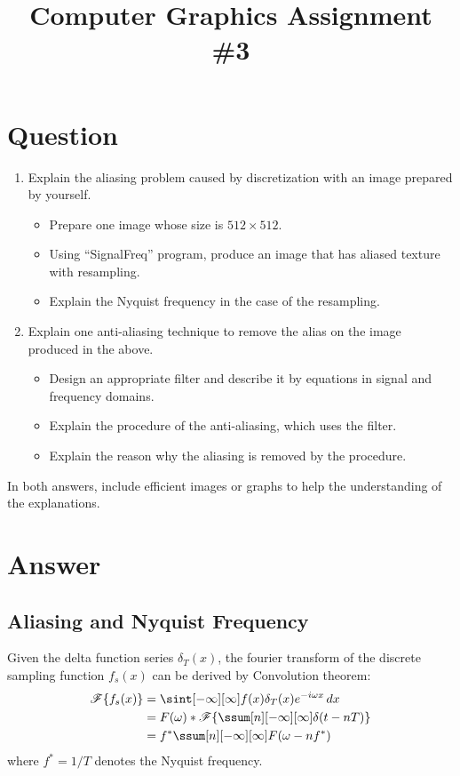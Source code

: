 

\usepackage{subfiles}
\usepackage{subcaption}
\usepackage{tikz}
\title{Computer Graphics Assignment \#3}

\section{Question}
\begin{enumerate}
    \item Explain the aliasing problem caused by discretization with an image prepared by yourself.
    \begin{itemize}
        \item Prepare one image whose size is $512 \times 512$.
        \item Using ``SignalFreq'' program, produce an image that has aliased texture with resampling.
        \item Explain the Nyquist frequency in the case of the resampling.
    \end{itemize}
    \item Explain one anti-aliasing technique to remove the alias on the image produced in the above.
    \begin{itemize}
        \item Design an appropriate filter and describe it by equations in signal and frequency domains.
        \item Explain the procedure of the anti-aliasing, which uses the filter.
        \item Explain the reason why the aliasing is removed by the procedure.
    \end{itemize}
\end{enumerate}
In both answers, include efficient images or graphs to help the understanding of the explanations.

\section{Answer}
\subsection{Aliasing and Nyquist Frequency}
Given the delta function series $\delta_T (x)$, the fourier transform of the discrete sampling function $f_s(x)$ can be derived by Convolution theorem:
\begin{align}
\fourier{f_s(x)}
&= \sint[-\infty][\infty] f(x)\delta_T(x) e^{-i\omega x} \dx \\
&= F(\omega) \ast \fourier{\ssum[n][-\infty][\infty] \delta(t-nT)} \\
&= f^* \ssum[n][-\infty][\infty] F(\omega - nf^*) \label{result}
\end{align}
where $f^* = 1 / T$ denotes the Nyquist frequency. 

